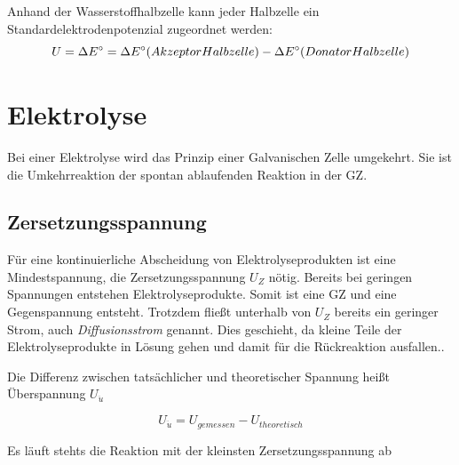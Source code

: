 \documentclass{article}
\begin{document}
Anhand der Wasserstoffhalbzelle kann jeder Halbzelle ein Standardelektrodenpotenzial zugeordnet werden:
\begin{equation}
    U = \Delta E\degree = \Delta E\degree (Akzeptor Halbzelle) - \Delta E\degree (Donator Halbzelle)    
\end{equation}

\section*{Elektrolyse}
Bei einer Elektrolyse wird das Prinzip einer Galvanischen Zelle umgekehrt. 
Sie ist die Umkehrreaktion der spontan ablaufenden Reaktion in der GZ.
\subsection*{Zersetzungsspannung}
Für eine kontinuierliche Abscheidung von Elektrolyseprodukten ist eine Mindestspannung, die Zersetzungsspannung
$U_Z$ nötig. Bereits bei geringen Spannungen entstehen Elektrolyseprodukte. Somit ist eine GZ und eine Gegenspannung 
entsteht. Trotzdem fließt unterhalb von $U_Z$ bereits ein geringer Strom, auch \emph{Diffusionsstrom} genannt.
Dies geschieht, da kleine Teile der Elektrolyseprodukte in Lösung gehen und damit für die Rückreaktion ausfallen..

Die Differenz zwischen tatsächlicher und theoretischer Spannung heißt Überspannung $U_{\ddot{u}}$

\begin{equation}
    U_{\ddot{u}} = U_{gemessen} - U_{theoretisch}
\end{equation}

Es läuft stehts die Reaktion mit der kleinsten Zersetzungsspannung ab
\end{document}
